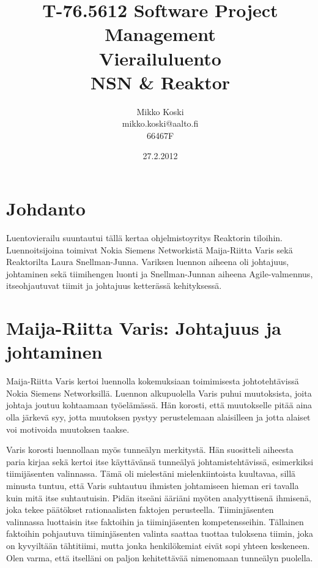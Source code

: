 \documentclass[a4paper]{article}
\begin{document}
\title{\small T-76.5612 Software Project Management \\ Vierailuluento \\ \huge NSN \& Reaktor}
\date{27.2.2012}
\author{Mikko Koski \\ mikko.koski@aalto.fi \\ 66467F}
\maketitle

\normalsize

\section{Johdanto}

Luentovierailu suuntautui tällä kertaa ohjelmistoyritys Reaktorin tiloihin. Luennoitsijoina toimivat Nokia Siemens Networkistä Maija-Riitta Varis sekä Reaktorilta Laura Snellman-Junna. Variksen luennon aiheena oli johtajuus, johtaminen sekä tiimihengen luonti ja Snellman-Junnan aiheena Agile-valmennus, itseohjautuvat tiimit ja johtajuus ketterässä kehityksessä.

\section{Maija-Riitta Varis: Johtajuus ja johtaminen}

Maija-Riitta Varis kertoi luennolla kokemuksiaan toimimisesta johtotehtävissä Nokia Siemens Networksillä. Luennon alkupuolella Varis puhui muutoksista, joita johtaja joutuu kohtaamaan työelämässä. Hän korosti, että muutokselle pitää aina olla järkevä syy, jotta muutoksen pystyy perustelemaan alaisilleen ja jotta alaiset voi motivoida muutoksen taakse.

Varis korosti luennollaan myös tunneälyn merkitystä. Hän suositteli aiheesta paria kirjaa sekä kertoi itse käyttävänsä tunneälyä johtamistehtävissä, esimerkiksi tiimijäsenten valinnassa. Tämä oli mielestäni mielenkiintoista kuultavaa, sillä minusta tuntuu, että Varis suhtautuu ihmisten johtamiseen hieman eri tavalla kuin mitä itse suhtautuisin. Pidän itseäni ääriäni myöten analyyttisenä ihmisenä, joka tekee päätökset rationaalisten faktojen perusteella. Tiiminjäsenten valinnassa luottaisin itse faktoihin ja tiiminjäsenten kompetensseihin. Tällainen faktoihin pohjautuva tiiminjäsenten valinta saattaa tuottaa tuloksena tiimin, joka on kyvyiltään tähtitiimi, mutta jonka henkilökemiat eivät sopi yhteen keskeneen. Olen varma, että itselläni on paljon kehitettävää nimenomaan tunneälyn puolella.
\end{document}
